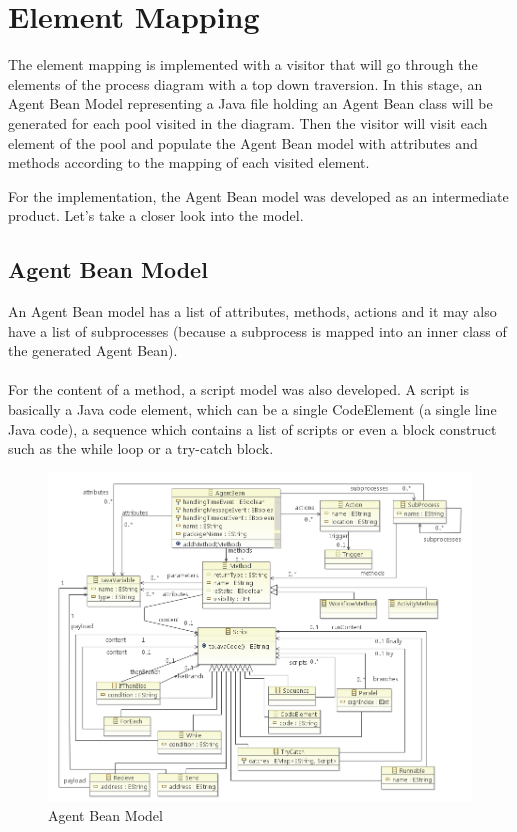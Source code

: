 \section{Element Mapping}
The element mapping is implemented with a visitor that will go through the elements of the process diagram with a top down traversion. In this stage, an Agent Bean Model representing a Java file holding an Agent Bean class will be generated for each pool visited in the diagram. Then the visitor will visit each element of the pool and  populate the Agent Bean model with attributes and methods according to the mapping of each visited element. 

For the implementation, the Agent Bean model was developed as an intermediate product. Let's take a closer look into the model. 
\subsection{Agent Bean Model}

An Agent Bean model has a list of attributes, methods, actions and it may also have a list of subprocesses (because a subprocess is mapped into an inner class of the generated Agent Bean).\\\\
For the content of a method, a script model was also developed. A script is basically a Java code element, which can be a single CodeElement (a single line Java code), a sequence which contains a list of scripts or even a block construct such as the while loop or a try-catch block. 

\begin{figure}[h]
	\centering\includegraphics[width=1.0\textwidth]{images/agentBean_metamodel.png}
	\caption{Agent Bean Model}
	\label{fig:agentbean_metamodel}
\end{figure}


